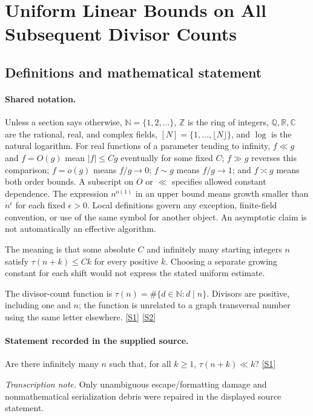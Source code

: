 \documentclass[11pt,a4paper]{article}
\newcommand{\N}{\mathbb{N}}
\newcommand{\Z}{\mathbb{Z}}
\newcommand{\Q}{\mathbb{Q}}
\newcommand{\R}{\mathbb{R}}
\newcommand{\C}{\mathbb{C}}
\newcommand{\sref}[2]{\hyperlink{source:#1:#2}{[S#2]}}
\begin{document}
\section{Uniform Linear Bounds on All Subsequent Divisor Counts}\label{statement}


\subsection{Definitions and mathematical statement}

\paragraph{Shared notation.}Unless a section says otherwise, $\N=\{1,2,\ldots\}$,
$\Z$ is the ring of integers, $\Q,\R,\C$ are the rational, real, and complex
fields, $[N]=\{1,\ldots,\lfloor N\rfloor\}$, and $\log$ is the natural
logarithm. For real functions of a parameter tending to infinity,
$f\ll g$ and $f=O(g)$ mean $|f|\leq Cg$ eventually for some fixed $C$;
$f\gg g$ reverses this comparison; $f=o(g)$ means $f/g\to0$;
$f\sim g$ means $f/g\to1$; and $f\asymp g$ means both order bounds.
A subscript on $O$ or $\ll$ specifies allowed constant dependence.
The expression $n^{o(1)}$ in an upper bound means growth smaller than
$n^\epsilon$ for each fixed $\epsilon>0$. Local definitions govern any
exception, finite-field convention, or use of the same symbol for another
object. An asymptotic claim is not automatically an effective algorithm.



The meaning is that some absolute $C$ and infinitely many starting integers $n$ satisfy $\tau(n+k)\leq Ck$ for every positive $k$. Choosing a separate growing constant for each shift would not express the stated uniform estimate.

The divisor-count function is $\tau(n)=\#\{d\in\N:d\mid n\}$. Divisors are positive, including one and $n$; the function is unrelated to a graph transversal number using the same letter elsewhere. \sref{statement}{1} \sref{statement}{2}

\paragraph{Statement recorded in the supplied source.}
Are there infinitely many $n$ such that, for all $k\geq 1$, $ \tau(n+k)\ll k? $ \sref{statement}{1}

{\small\emph{Transcription note.} Only unambiguous escape/formatting damage and nonmathematical serialization debris were repaired in the displayed source statement.}
\end{document}
